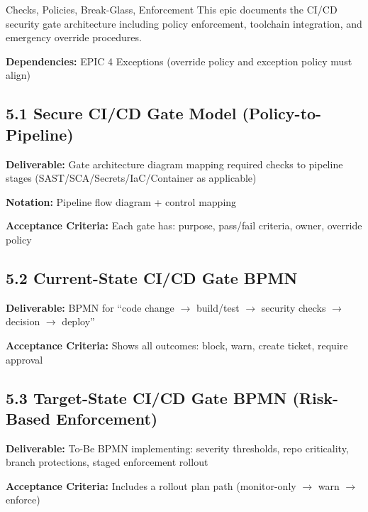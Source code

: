 \documentclass[11pt,letterpaper]{article}
\newcommand{\storyfield}[2]{\textbf{#1:} #2}
\begin{document}
\begin{epicbox}{Checks, Policies, Break-Glass, Enforcement}
This epic documents the CI/CD security gate architecture including policy enforcement, toolchain integration, and emergency override procedures.

\textbf{Dependencies:} EPIC 4 Exceptions (override policy and exception policy must align)
\end{epicbox}

\subsection{5.1 Secure CI/CD Gate Model (Policy-to-Pipeline)}

\begin{storycard}
\storyfield{Deliverable}{Gate architecture diagram mapping required checks to pipeline stages (SAST/SCA/Secrets/IaC/Container as applicable)}

\storyfield{Notation}{Pipeline flow diagram + control mapping}

\storyfield{Acceptance Criteria}{Each gate has: purpose, pass/fail criteria, owner, override policy}
\end{storycard}

\subsection{5.2 Current-State CI/CD Gate BPMN}

\begin{storycard}
\storyfield{Deliverable}{BPMN for ``code change $\rightarrow$ build/test $\rightarrow$ security checks $\rightarrow$ decision $\rightarrow$ deploy''}

\storyfield{Acceptance Criteria}{Shows all outcomes: block, warn, create ticket, require approval}
\end{storycard}

\subsection{5.3 Target-State CI/CD Gate BPMN (Risk-Based Enforcement)}

\begin{storycard}
\storyfield{Deliverable}{To-Be BPMN implementing: severity thresholds, repo criticality, branch protections, staged enforcement rollout}

\storyfield{Acceptance Criteria}{Includes a rollout plan path (monitor-only $\rightarrow$ warn $\rightarrow$ enforce)}
\end{storycard}
\end{document}
